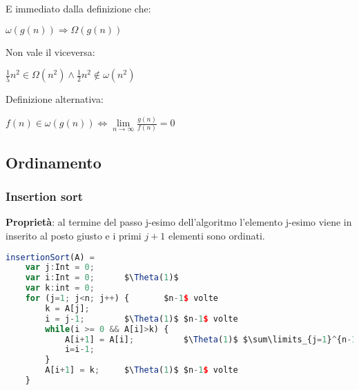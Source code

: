 \vspace{-15pt}
E immediato dalla definizione che:
\begin{center}
	$\omega(g(n)) \Longrightarrow \Omega(g(n))$
\end{center}
Non vale il viceversa: 
\begin{center}
	$\frac{1}{5}n^2 \in \Omega(n^2) \land \frac{1}{2}n^2 \notin \omega(n^2)$
\end{center}
Definizione alternativa:
\begin{center}
	$f(n) \in \omega(g(n)) \Longleftrightarrow \lim\limits_{n\to \infty}\frac{g(n)}{f(n)} = 0$
\end{center}

\subsection{Ordinamento}
\subsubsection{Insertion sort}
\textbf{Proprietà}: al termine del passo j-esimo dell'algoritmo l'elemento j-esimo viene in inserito al posto giusto e i primi $j+1$ elementi sono ordinati.
\begin{lstlisting}[language=Javascript, caption=Algoritmo insertion sort, mathescape=true]
	insertionSort(A) =
	var j:Int = 0;
	var i:Int = 0;		$\Theta(1)$
	var k:int = 0;
	for (j=1; j<n; j++) {		$n-1$ volte
		k = A[j];
		i = j-1;		$\Theta(1)$ $n-1$ volte
		while(i >= 0 && A[i]>k) {
			A[i+1] = A[i];			$\Theta(1)$ $\sum\limits_{j=1}^{n-1} (t_j-1)$ volte
			i=i-1;
		}
		A[i+1] = k;		$\Theta(1)$ $n-1$ volte
	}
\end{lstlisting}


